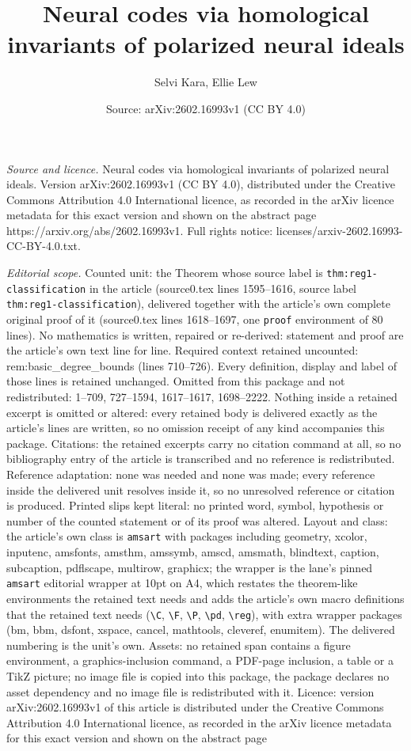 \documentclass[10pt,a4paper]{amsart}
\title[Neural codes via homological invariants of polarized neural ]{Neural codes via homological invariants of polarized neural ideals}
\author{Selvi Kara, Ellie Lew}
\date{Source: arXiv:2602.16993v1 (CC BY 4.0)}
\begin{document}
\maketitle

\noindent\emph{Source and licence.} Neural codes via homological invariants of polarized neural ideals. Version arXiv:2602.16993v1 (CC BY 4.0), distributed under the Creative Commons Attribution 4.0 International licence, as recorded in the arXiv licence metadata for this exact version and shown on the abstract page https://arxiv.org/abs/2602.16993v1. Full rights notice: licenses/arxiv-2602.16993-CC-BY-4.0.txt.\par\smallskip

\noindent\textit{Editorial scope.} Counted unit: the Theorem whose source label is \texttt{thm:reg1-classification} in the article (source0.tex lines 1595--1616, source label \texttt{thm:reg1-classification}), delivered together with the article's own complete original proof of it (source0.tex lines 1618--1697, one \texttt{proof} environment of 80 lines). No mathematics is written, repaired or re-derived: statement and proof are the article's own text line for line. Required context retained uncounted: rem:basic\_degree\_bounds (lines 710--726). Every definition, display and label of those lines is retained unchanged. Omitted from this package and not redistributed: 1--709, 727--1594, 1617--1617, 1698--2222. Nothing inside a retained excerpt is omitted or altered: every retained body is delivered exactly as the article's lines are written, so no omission receipt of any kind accompanies this package. Citations: the retained excerpts carry no citation command at all, so no bibliography entry of the article is transcribed and no reference is redistributed. Reference adaptation: none was needed and none was made; every reference inside the delivered unit resolves inside it, so no unresolved reference or citation is produced. Printed slips kept literal: no printed word, symbol, hypothesis or number of the counted statement or of its proof was altered. Layout and class: the article's own class is \texttt{amsart} with packages including geometry, xcolor, inputenc, amsfonts, amsthm, amssymb, amscd, amsmath, blindtext, caption, subcaption, pdflscape, multirow, graphicx; the wrapper is the lane's pinned \texttt{amsart} editorial wrapper at 10pt on A4, which restates the theorem-like environments the retained text needs and adds the article's own macro definitions that the retained text needs (\texttt{\textbackslash C}, \texttt{\textbackslash F}, \texttt{\textbackslash P}, \texttt{\textbackslash pd}, \texttt{\textbackslash reg}), with extra wrapper packages (bm, bbm, dsfont, xspace, cancel, mathtools, cleveref, enumitem). The delivered numbering is the unit's own. Assets: no retained span contains a figure environment, a graphics-inclusion command, a PDF-page inclusion, a table or a TikZ picture; no image file is copied into this package, the package declares no asset dependency and no image file is redistributed with it. Licence: version arXiv:2602.16993v1 of this article is distributed under the Creative Commons Attribution 4.0 International licence, as recorded in the arXiv licence metadata for this exact version and shown on the abstract page 
\end{document}
